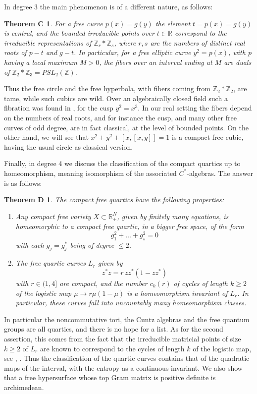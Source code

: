 \documentclass[11pt]{amsart}
\newtheorem*{theoremc}{Theorem C}
\newtheorem*{theoremd}{Theorem D}
\theoremstyle{definition}
\begin{document}
In degree 3 the main phenomenon is of a different nature, as follows:

\begin{theoremc}
For a free curve $p(x)=g(y)$ the element $t=p(x)=g(y)$ is central, and the bounded irreducible points over $t\in\mathbb R$ correspond to the irreducible representations of $\mathbb Z_r*\mathbb Z_s$, where $r,s$ are the numbers of distinct real roots of $p-t$ and $g-t$. In particular, for a free elliptic curve $y^2=p(x)$, with $p$ having a local maximum $M>0$, the fibers over an interval ending at $M$ are duals of $\mathbb Z_2*\mathbb Z_3=PSL_2(\mathbb Z)$.
\end{theoremc}

Thus the free circle and the free hyperbola, with fibers coming from $\mathbb Z_2*\mathbb Z_2$, are tame, while such cubics are wild. Over an algebraically closed field such a fibration was found in \cite{jls}, for the cusp $y^2=x^3$. In our real setting the fibers depend on the numbers of real roots, and for instance the cusp, and many other free curves of odd degree, are in fact classical, at the level of bounded points. On the other hand, we will see that $x^2+y^2+[x,[x,y]]=1$ is a compact free cubic, having the usual circle as classical version.

Finally, in degree 4 we discuss the classification of the compact quartics up to homeomorphism, meaning isomorphism of the associated $C^*$-algebras. The answer is as follows:

\begin{theoremd}
The compact free quartics have the following properties:
\begin{enumerate}
\item Any compact free variety $X\subset\mathbb R^N_+$, given by finitely many equations, is homeomorphic to a compact free quartic, in a bigger free space, of the form
$$g_1^2+\ldots+g_s^2=0$$
with each $g_j=g_j^*$ being of degree $\leq2$.

\item The free quartic curves $L_r$ given by
$$z^*z=r\,zz^*(1-zz^*)$$
with $r\in(1,4]$ are compact, and the number $c_k(r)$ of cycles of length $k\geq2$ of the logistic map $\mu\to r\mu(1-\mu)$ is a homeomorphism invariant of $L_r$. In particular, these curves fall into uncountably many homeomorphism classes.
\end{enumerate}
\end{theoremd}

In particular the noncommutative tori, the Cuntz algebras and the free quantum groups are all quartics, and there is no hope for a list. As for the second assertion, this comes from the fact that the irreducible matricial points of size $k\geq2$ of $L_r$ are known to correspond to the cycles of length $k$ of the logistic map, see \cite{crm}, \cite{os1}. Thus the classification of the quartic curves contains that of the quadratic maps of the interval, with the entropy as a continuous invariant. We also show that a free hypersurface whose top Gram matrix is positive definite is archimedean.
\end{document}
